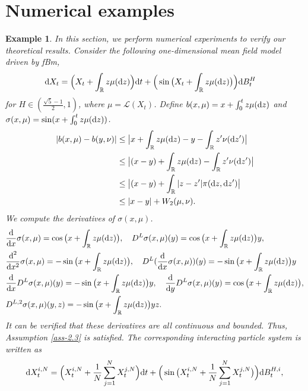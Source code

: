 \documentclass[12pt]{article}
\newtheorem{example}[theorem]{Example}
\def\L{\mathscr{L}}
\def\R{\mathbb R}
\def\d{\text{\rm{d}}}
\numberwithin{equation}{section}
\begin{document}
\section{Numerical examples}
\begin{example}
	In this section, we perform numerical experiments to verify our theoretical results. Consider the following one-dimensional mean field model driven by fBm,
	\begin{align}\label{5.1}
		\begin{aligned}
			\d {X}_t&=\Big(X_t+\int_\R z\mu(\d z)\Big)\d t+\Big( \sin\big( X_t+\int_\R z\mu(\d z)\big)\Big)\d B^{H}_t
		\end{aligned}
	\end{align}
	for $H\in (\frac{\sqrt{5}-1}{2},1)$, where $\mu=\L(X_t)$. Define $b(x,\mu)=x+\int_{0}^{t}z\mu(\d z)$ and $\sigma(x,\mu)=\sin(x+\int_{0}^{t}z\mu(\d z))$.
	\begin{align*}
		|b(x,\mu)-b(y,\nu)|&\leq \big|x+\int_\R z\mu(\d z)-y-\int_\R z'\nu(\d z')\big|\\
		&\leq \big|(x-y)+\int_\R z\mu(\d z)-\int_\R z'\nu(\d z')\big|\\
		&\leq \big|(x-y)+\int_\R |z-z'|\pi(\d z,\d z')\big|\\
		&\leq |x-y|+W_2(\mu,\nu).
	\end{align*}
	 We compute the derivatives of $\sigma(x,\mu)$.
	\begin{align*}
		&\frac{\d}{\d x}\sigma(x,\mu)=\cos\big(  x+\int_\R z\mu(\d z)\big),\quad
        D^L\sigma(x,\mu)(y)=\cos\big(  x+\int_\R z\mu(\d z)\big)y,\\
		&\frac{\d^2}{\d x^2}\sigma(x,\mu)=-\sin\big(  x+\int_\R z\mu(\d z)\big), \quad D^L(\frac{\d}{\d x}\sigma(x,\mu))(y)=-\sin\big(  x+\int_\R z\mu(\d z)\big)y\\
		&\frac{\d}{\d x}D^L\sigma(x,\mu)(y)=-\sin\big(  x+\int_\R z\mu(\d z)\big)y, \quad \frac{\d}{\d y}D^L\sigma(x,\mu)(y)=\cos\big(  x+\int_\R z\mu(\d z)\big),\\
		& D^{L,2}\sigma(x,\mu)(y,z)=-\sin\big(  x+\int_\R z\mu(\d z)\big)yz.
	\end{align*}
	It can be verified that these derivatives are all continuous and bounded. Thus, Assumption \ref{ass-2.3} is satisfied.
	The corresponding interacting particle system is written as
	\begin{align}\label{5.2}
		\begin{aligned}
			\d X^{i,N}_t
			=\Big(X^{i,N}_t+\frac{1}{N}\sum_{j=1}^NX^{j,N}_t\Big)\d t+
			\Big( \sin\big(X^{i,N}_t+\frac{1}{N}\sum_{j=1}^NX^{j,N}_t\big)\Big)\d B^{H,i}_t,

\end{aligned}
\end{align}
\end{example}
\end{document}
